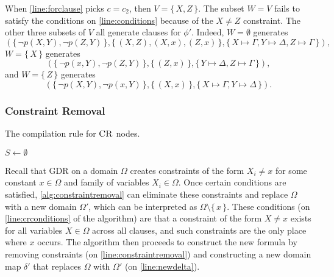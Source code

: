 \begin{example}
  When \cref{line:forclause} picks $c = c_2$, then $V = \{\, X, Z \,\}$. The
  subset $W = V$ fails to satisfy the conditions on \cref{line:conditions}
  because of the $X \ne Z$ constraint. The other three subsets of $V$ all
  generate clauses for $\phi'$. Indeed, $W = \emptyset$ generates
  \[
    (\{\, \neg p(X, Y), \neg p(Z, Y) \,\}, \{\, (X, Z), (X, x), (Z, x) \,\}, \{\, X \mapsto \Gamma, Y \mapsto \Delta, Z \mapsto \Gamma \,\}),
  \]
  $W = \{\, X \,\}$ generates
  \[
    (\{\, \neg p(x, Y), \neg p(Z, Y) \,\}, \{\, (Z, x) \,\}, \{\, Y \mapsto \Delta, Z \mapsto \Gamma \,\}),
  \]
  and $W = \{\, Z \,\}$ generates
  \[
    (\{\, \neg p(X, Y), \neg p(x, Y) \,\}, \{\, (X, x) \,\}, \{\, X \mapsto \Gamma, Y \mapsto \Delta \,\}).
  \]
\end{example}

\subsubsection{Constraint Removal}\label{sec:cr}

\begin{algorithm}[t]
  \caption{The compilation rule for $\operatorname{\textsc{CR}}$ nodes.}\label{alg:constraintremoval}
  $S \gets \emptyset$\;
\end{algorithm}

Recall that GDR on a domain $\Omega$ creates constraints of the form $X_i \ne x$
for some constant $x \in \Omega$ and family of variables $X_i \in \Omega$. Once
certain conditions are satisfied, \cref{alg:constraintremoval} can eliminate
these constraints and replace $\Omega$ with a new domain $\Omega'$, which can be
interpreted as $\Omega \setminus \{\, x \,\}$. These conditions (on
\cref{line:crconditions} of the algorithm) are that a constraint of the form
$X \ne x$ exists for all variables $X \in \Omega$ across all clauses, and such
constraints are the only place where $x$ occurs. The algorithm then proceeds to
construct the new formula by removing constraints (on
\cref{line:constraintremoval}) and constructing a new domain map $\delta'$ that
replaces $\Omega$ with $\Omega'$ (on \cref{line:newdelta}).

